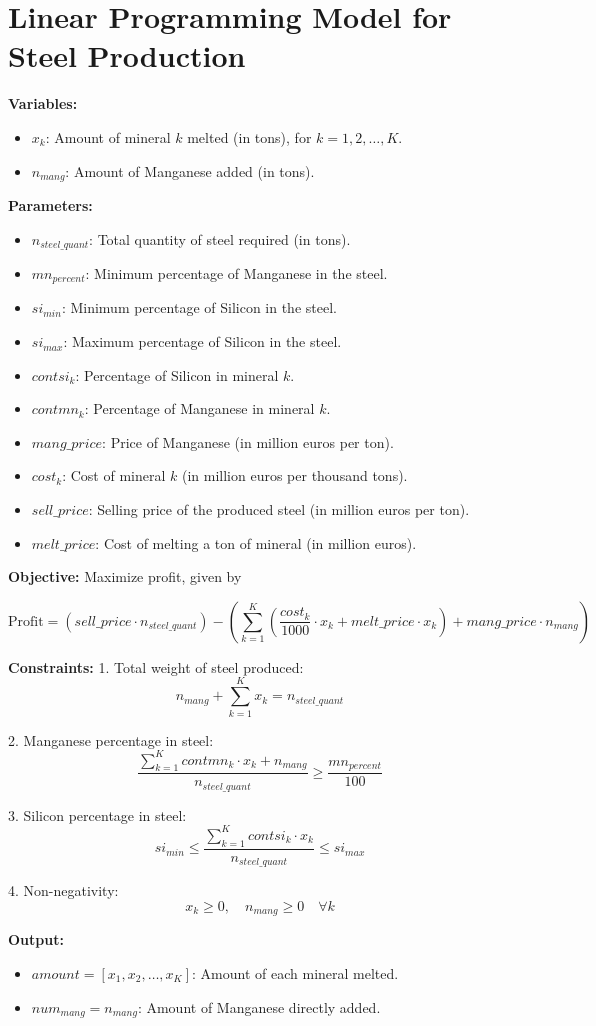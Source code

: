 \documentclass{article}
\begin{document}
\section*{Linear Programming Model for Steel Production}

\textbf{Variables:}
\begin{itemize}
    \item \( x_k \): Amount of mineral \( k \) melted (in tons), for \( k = 1, 2, \ldots, K \).
    \item \( n_{mang} \): Amount of Manganese added (in tons).
\end{itemize}

\textbf{Parameters:}
\begin{itemize}
    \item \( n_{steel\_quant} \): Total quantity of steel required (in tons).
    \item \( mn_{percent} \): Minimum percentage of Manganese in the steel.
    \item \( si_{min} \): Minimum percentage of Silicon in the steel.
    \item \( si_{max} \): Maximum percentage of Silicon in the steel.
    \item \( contsi_k \): Percentage of Silicon in mineral \( k \).
    \item \( contmn_k \): Percentage of Manganese in mineral \( k \).
    \item \( mang\_price \): Price of Manganese (in million euros per ton).
    \item \( cost_k \): Cost of mineral \( k \) (in million euros per thousand tons).
    \item \( sell\_price \): Selling price of the produced steel (in million euros per ton).
    \item \( melt\_price \): Cost of melting a ton of mineral (in million euros).
\end{itemize}

\textbf{Objective:} Maximize profit, given by

\[
\text{Profit} = (sell\_price \cdot n_{steel\_quant}) - \left( \sum_{k=1}^{K} \left( \frac{cost_k}{1000} \cdot x_k + melt\_price \cdot x_k \right) + mang\_price \cdot n_{mang} \right)
\]

\textbf{Constraints:}
1. Total weight of steel produced:
\[
n_{mang} + \sum_{k=1}^{K} x_k = n_{steel\_quant}
\]

2. Manganese percentage in steel:
\[
\frac{\sum_{k=1}^{K} contmn_k \cdot x_k + n_{mang}}{n_{steel\_quant}} \geq \frac{mn_{percent}}{100}
\]

3. Silicon percentage in steel:
\[
si_{min} \leq \frac{\sum_{k=1}^{K} contsi_k \cdot x_k}{n_{steel\_quant}} \leq si_{max}
\]

4. Non-negativity:
\[
x_k \geq 0, \quad n_{mang} \geq 0 \quad \forall k
\]

\textbf{Output:}
\begin{itemize}
    \item \( amount = [x_1, x_2, \ldots, x_K] \): Amount of each mineral melted.
    \item \( num_{mang} = n_{mang} \): Amount of Manganese directly added.
\end{itemize}
\end{document}
